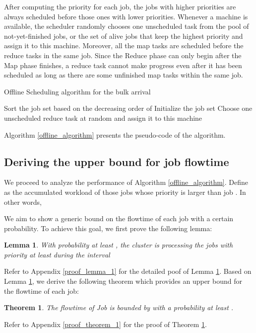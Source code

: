\documentclass[10pt,conference,compsocconf,letterpaper]{IEEEtran}
\newtheorem{Theorem}{Theorem}
\newtheorem{lemma}{Lemma}
\begin{document}
After computing the priority for each job,  the jobs with higher priorities are always scheduled before those ones with lower priorities. Whenever a machine is available, the scheduler randomly chooses one unscheduled task from the pool of not-yet-finished jobs, or the set of alive jobs that keep the highest priority and assign it to this machine. Moreover, all the map tasks are scheduled before the reduce tasks in the same job.
Since the Reduce phase can only begin after the Map phase finishes, a reduce task cannot make progress even after it has been scheduled as long as there are some unfinished map tasks within the same job.


\IncMargin{1em}
\begin{algorithm}
\label{offline_algorithm}
\caption{Offline Scheduling algorithm for the bulk arrival}
\Indm
{}
\Indp
Sort the job set  based on the decreasing order of  \;
Initialize the job set \;
{
{
{
Choose one unscheduled reduce task at random and assign it to this machine\;
}
{
\;
}
}
}
\end{algorithm}
\DecMargin{1em}

Algorithm \ref{offline_algorithm} presents the pseudo-code of the algorithm.




\subsection{Deriving the upper bound for job flowtime}
We proceed to analyze the performance of Algorithm \ref{offline_algorithm}. Define  as the accumulated workload of those jobs whose priority is larger than job . In other words,

We aim to show a generic bound on the flowtime of each job with a certain probability. To achieve this goal, we first prove the following lemma:
\begin{lemma}
\label{Lemma_1}
With probability at least , the cluster is processing the jobs with priority at least  during the interval 
\end{lemma}
Refer to Appendix \ref{proof_lemma_1} for the detailed poof of Lemma \ref{Lemma_1}.
Based on Lemma \ref{Lemma_1}, we derive the following theorem which provides an upper bound for the flowtime of
each job:
\begin{Theorem}
\label{Theorem 1}
The flowtime of Job  is bounded by  with a probability at least .
\end{Theorem}
Refer to Appendix \ref{proof_theorem_1} for the proof of Theorem \ref{Theorem 1}.
\end{document}

